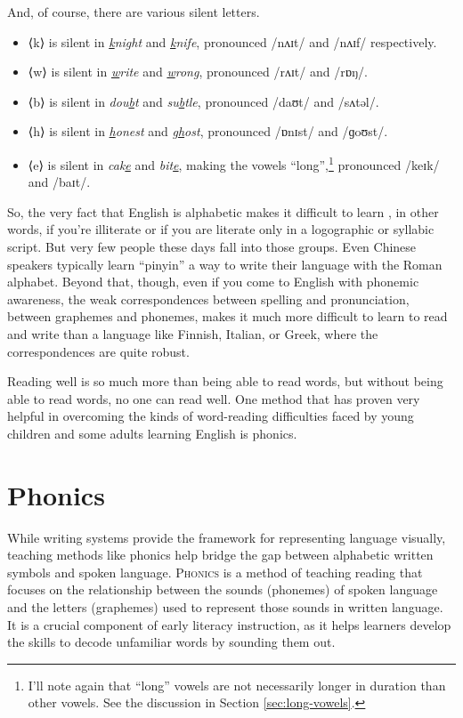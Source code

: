 And, of course, there are various silent letters.

\begin{itemize}[noitemsep]
    \item ⟨k⟩ is silent in \textit{\uline{k}night} and \textit{\uline{k}nife}, pronounced /nʌɪt/ and /nʌɪf/ respectively.
    \item ⟨w⟩ is silent in \textit{\uline{w}rite} and \textit{\uline{w}rong}, pronounced /rʌɪt/ and /rɒŋ/.
    \item ⟨b⟩ is silent in \textit{dou\uline{b}t} and \textit{su\uline{b}tle}, pronounced /daʊt/ and /sʌtəl/.
    \item ⟨h⟩ is silent in \textit{\uline{h}onest} and \textit{g\uline{h}ost}, pronounced /ɒnɪst/ and /ɡoʊst/.
    \item ⟨e⟩ is silent in \textit{cak\uline{e}} and \textit{bit\uline{e}}, making the vowels ``long'',\footnote{I'll note again that ``long'' vowels are not necessarily longer in duration than other vowels. See the discussion in Section \ref{sec:long-vowels}.} pronounced /keɪk/ and /baɪt/.
\end{itemize}

So, the very fact that English is alphabetic makes it difficult to learn , in other words, if you're illiterate or if you are literate only in a logographic or syllabic script. But very few people these days fall into those groups. Even Chinese speakers typically learn ``pinyin'' a way to write their language with the Roman alphabet. Beyond that, though, even if you come to English with phonemic awareness, the weak correspondences between spelling and pronunciation, between graphemes and phonemes, makes it much more difficult to learn to read and write than a language like Finnish, Italian, or Greek, where the correspondences are quite robust.

Reading well is so much more than being able to read words, but without being able to read words, no one can read well. One method that has proven very helpful in overcoming the kinds of word-reading difficulties faced by young children and some adults learning English is phonics.

\section{Phonics} \label{sec:phonics}

While writing systems provide the framework for representing language visually, teaching methods like phonics help bridge the gap between alphabetic written symbols and spoken language. \textsc{Phonics} is a method of teaching reading that focuses on the relationship between the sounds (phonemes) of spoken language and the letters (graphemes) used to represent those sounds in written language. It is a crucial component of early literacy instruction, as it helps learners develop the skills to decode unfamiliar words by sounding them out.

